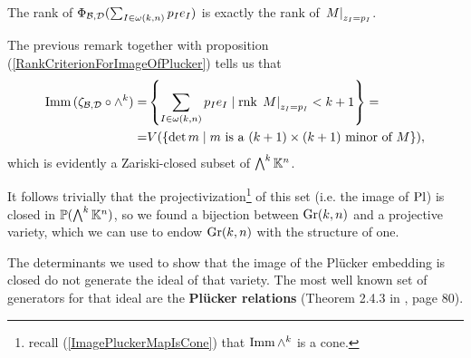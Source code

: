 \begin{remark}
The rank of $\Phi_{\mathcal{B},\mathcal{D}}(\sum_{I\in\omega(k,n)}p_Ie_I)$ is exactly the rank of $\left.{M}\right|_{z_I=p_I}$.
\end{remark}

\noindent The previous remark together with proposition (\ref{RankCriterionForImageOfPlucker}) tells us that
\begin{align*}
\mathrm{Imm}\, (\zeta_{\mathcal{B},\mathcal{D}}\circ \wedge^k)=&\left\{{\sum_{I\in \omega(k,n)}p_Ie_I\mid \mathrm{rnk}\, \left.{M}\right|_{z_I=p_I}<k+1}\right\}=\\
=&V(\left\{{\det m\mid m\text{ is a $(k+1)\times(k+1)$ minor of $M$}}\right\}),
\end{align*}
which is evidently a Zariski-closed subset of $\bigwedge^k\mathbb{K}^n$.\bigskip

It follows trivially that the projectivization\footnote{recall (\ref{ImagePluckerMapIsCone}) that $\mathrm{Imm}\, \wedge^k$ is a cone.} of this set (i.e. the image of $\mathrm{Pl}$) is closed in $\mathbb{P}(\bigwedge^k\mathbb{K}^n)$, so we found a bijection between $\mathrm{Gr}(k,n)$ and a projective variety, which we can use to endow $\mathrm{Gr}(k,n)$ with the structure of one.


\begin{remark}
The determinants we used to show that the image of the Pl\"ucker embedding is closed do not generate the ideal of that variety. The most well known set of generators for that ideal are the \textbf{Pl\"ucker relations} (Theorem 2.4.3 in \cite{matroids}, page 80).
\end{remark}










